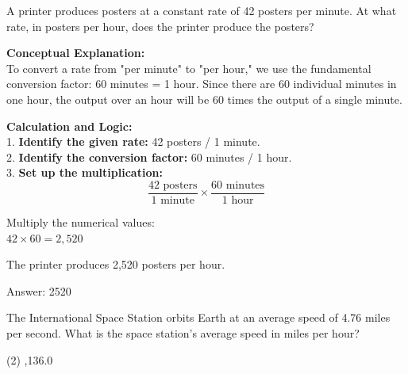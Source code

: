 \documentclass[11pt,paper=a4,answers]{exam}
\begin{document}
\begin{questions}
\pointsinrightmargin
\pointsdroppedatright
\marksnotpoints
{}
\pointformat{\boldmath\themarginpoints}
\bracketedpoints


\question
A printer produces posters at a constant rate of 42 posters per minute. At what rate, in posters per hour, does the printer produce the posters?

\begin{solution}
\textbf{Conceptual Explanation:} \\
To convert a rate from "per minute" to "per hour," we use the fundamental conversion factor: 60 minutes = 1 hour. Since there are 60 individual minutes in one hour, the output over an hour will be 60 times the output of a single minute.

\vspace{30pt}

\textbf{Calculation and Logic:} \\
1. \textbf{Identify the given rate:} 42 posters / 1 minute. \\
2. \textbf{Identify the conversion factor:} 60 minutes / 1 hour. \\
3. \textbf{Set up the multiplication:}
\[ \frac{42 \text{ posters}}{1 \text{ minute}} \times \frac{60 \text{ minutes}}{1 \text{ hour}} \]

\vspace{20pt}

Multiply the numerical values: \\
$42 \times 60 = 2,520$

\vspace{10pt}

The printer produces 2,520 posters per hour.

\vspace{30pt}

Answer: \colorbox{yellow!100}{2520}
\end{solution}

\vspace{60pt}

\question
The International Space Station orbits Earth at an average speed of 4.76 miles per second. What is the space station's average speed in miles per hour?
\begin{tasks}(2)
    ,136.0
\end{tasks}


\end{questions}
\end{document}
